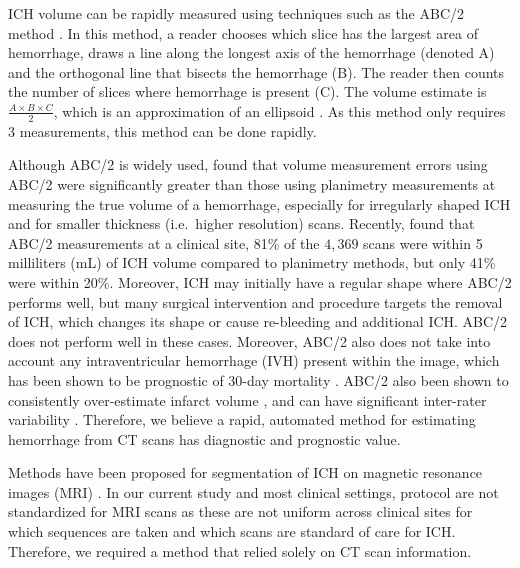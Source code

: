 ICH volume can be rapidly measured using techniques such as the ABC/2 method \citep{broderick_volume_1993}.  In this method, a reader chooses which slice has the largest area of hemorrhage, draws a line along the longest axis of the hemorrhage (denoted A) and the orthogonal line that bisects the hemorrhage (B).  The reader then counts the number of slices where hemorrhage is present (C).  The volume estimate is $\frac{A\times B\times C}{2}$, which is an approximation of an ellipsoid \citep{kothari_abcs_1996}.  As this method only requires 3 measurements, this method can be done rapidly. 

Although ABC/2 is widely used, \citet{divani_abcs_2011} found that volume measurement errors using ABC/2 were significantly greater than those using planimetry measurements at measuring the true volume of a hemorrhage, especially for irregularly shaped ICH and for smaller thickness (i.e.~higher resolution) scans.  Recently, \citet{webb_accuracy_2015} found that ABC/2 measurements at a clinical site, 81\% of the $4,369$ scans were within 5 milliliters (mL) of ICH volume compared to planimetry methods, but only 41\% were within 20\%.   Moreover, ICH may initially have a regular shape where ABC/2 performs well, but many surgical intervention and procedure targets the removal of ICH, which changes its shape or cause re-bleeding and additional ICH.  ABC/2 does not perform well in these cases.  Moreover, ABC/2 also does not take into account any intraventricular hemorrhage (IVH) present within the image, which has been shown to be prognostic of 30-day mortality \citep{hemphill_ich_2001, tuhrim_volume_1999}.  ABC/2 also been shown to consistently over-estimate infarct volume \citep{pedraza_reliability_2012}, and can have significant inter-rater variability \citep{hussein_reliability_2013}. Therefore, we believe a rapid, automated method for estimating hemorrhage from CT scans has diagnostic and prognostic value.

Methods have been proposed for segmentation of ICH on magnetic resonance images (MRI) \citep{wang_hematoma_2013, carhuapoma2003brain}.  In our current study and most clinical settings, protocol are not standardized for MRI scans as these are not uniform across clinical sites for which sequences are taken and which scans are standard of care for ICH.  Therefore, we required a method that relied solely on CT scan information.

